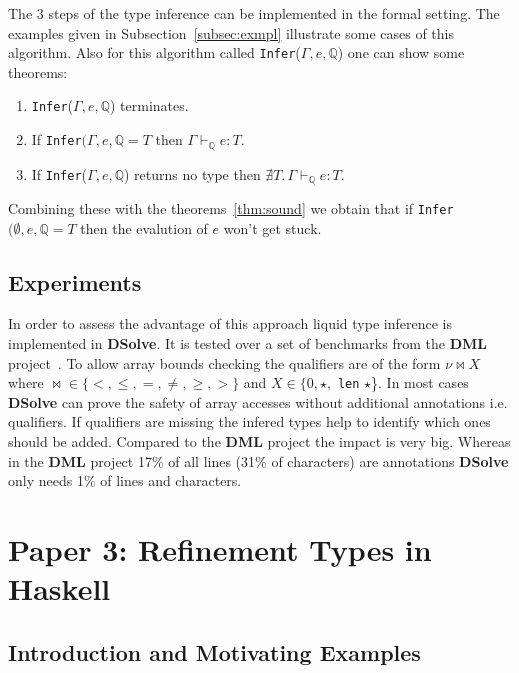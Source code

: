 \documentclass[a4paper,UKenglish]{lipics-v2016}
\begin{document}
The 3 steps of the type inference can be implemented in the formal setting.
The examples given in Subsection~\ref{subsec:exmpl} illustrate some cases of this algorithm.
Also for this algorithm called \lstinline{Infer}($\Gamma, e, \mathbb{Q}$) one can show some theorems:
\begin{enumerate}
    \item \lstinline{Infer}($\Gamma, e, \mathbb{Q}$) terminates.
    \item If \lstinline{Infer}$(\Gamma, e, \mathbb{Q} = T$ then $\Gamma \vdash_{\mathbb{Q}} e: T$.
    \item If \lstinline{Infer}($\Gamma, e, \mathbb{Q}$) returns no type then $\nexists T.\, \Gamma \vdash_{\mathbb{Q}} e: T$.
\end{enumerate}

Combining these with the theorems~\ref{thm:sound} we obtain that if \lstinline{Infer}$(\emptyset, e, \mathbb{Q} = T$ then the evalution of $e$ won't get stuck.

\subsection{Experiments}

In order to assess the advantage of this approach liquid type inference is implemented in \textbf{DSolve}.
It is tested over a set of benchmarks from the \textbf{DML} project~\cite{Xi:1998:EAB}.
To allow array bounds checking the qualifiers are of the form $\nu \bowtie X$ where $\bowtie \in \{<, \le, =, \neq, \geq, >\}$ and $X \in \{0, \star,$ \lstinline{len} $\star$\}.
In most cases \textbf{DSolve} can prove the safety of array accesses without additional annotations i.e. qualifiers.
If qualifiers are missing the infered types help to identify which ones should be added.
Compared to the \textbf{DML} project the impact is very big.
Whereas in the \textbf{DML} project 17\% of all lines (31\% of characters) are annotations \textbf{DSolve} only needs 1\% of lines and characters.



\section{Paper 3: Refinement Types in Haskell}

\subsection{Introduction and Motivating Examples}
\end{document}
